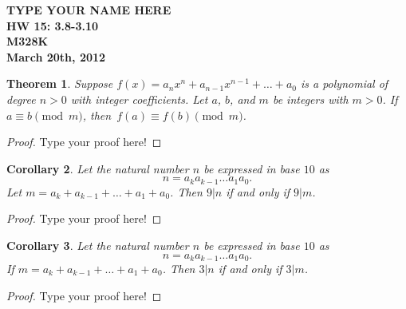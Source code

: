 \documentclass[12pt,leqno]{article}
\numberwithin{equation}{section}
\newtheorem{thm}{Theorem}[section]
\newtheorem{cor}[thm]{Corollary}
\theoremstyle{definition}
\begin{document}
\thispagestyle{plain}
\begin{flushright}
\large{\textbf{TYPE YOUR NAME HERE \\
HW 15: 3.8-3.10\\
M328K \\
March 20th, 2012 \\}}
\end{flushright}

\markboth{}{} \setcounter{section}{0} \baselineskip=18pt

\setcounter{tocdepth}{4}



\setcounter{section}{3}

\setcounter{thm}{7}


\begin{thm}
Suppose $f(x) = a_nx^n + a_{n-1}x^{n-1} + \hdots + a_0$ is a
polynomial of degree $n>0$ with integer coefficients.  Let $a$, $b$,
and $m$ be integers with $m > 0$.  If $a \equiv b \pmod{m}$,
then~$f(a) \equiv f(b) \pmod{m}$.
\end{thm}

\begin{proof}[Proof]
Type your proof here!
\end{proof}

\begin{cor}
Let the natural number $n$ be expressed in base $10$ as
\[n = a_k a_{k-1} \hdots a_1 a_0. \]
 Let $m = a_k + a_{k-1} + \hdots + a_1 + a_0$. Then $9|n$ if and only if $9|m$.
\end{cor}

\begin{proof}[Proof]
Type your proof here!
\end{proof}


\begin{cor}
Let the natural number $n$ be expressed in base $10$ as
\[n = a_k a_{k-1} \hdots a_1 a_0. \]
If $m = a_k + a_{k-1} + \hdots + a_1 + a_0$. Then $3|n$ if and only
if $3|m$.
\end{cor}

\begin{proof}[Proof]
Type your proof here!
\end{proof}
\end{document}
